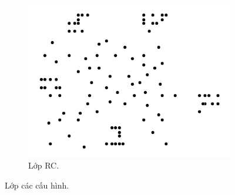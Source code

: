 \begin{figure}[H]
\begin{subfigure}{.3\textwidth}
		\includegraphics[width=1\linewidth]{figures/cls_rc.png}
		\caption{Lớp RC.}
		\label{fig:cls_rc}
	\end{subfigure}
	\caption{Lớp các cấu hình.}
\end{figure}

